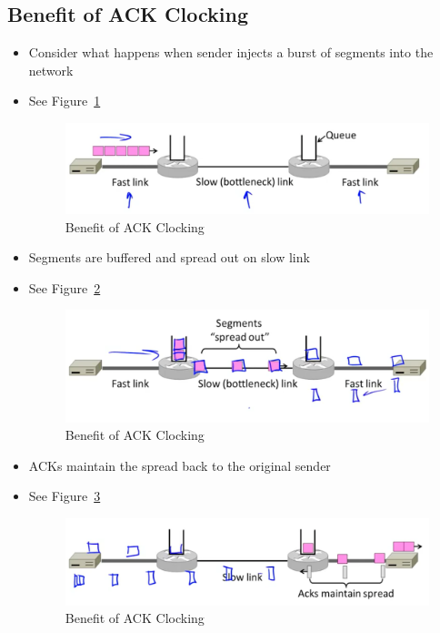 \documentclass[12pt]{ctexart}   %
\begin{document}
	\subsection{Benefit of ACK Clocking}
	\begin{itemize}
		\item Consider what happens when sender injects a burst of segments into the network
		\item See Figure~\ref{fig:7-5-3}
		  
		 \begin{figure}[h!] %
		\centering
		 \includegraphics[scale=0.7]{images/7-5-3}
		\caption{ Benefit of ACK Clocking}
		 \label{fig:7-5-3}
		 \end{figure}
		 
		 \item Segments are buffered and spread out on slow link
		 \item See Figure~\ref{fig:7-5-4}
		  
		 \begin{figure}[h!] %
		\centering
		 \includegraphics[scale=0.7]{images/7-5-4}
		\caption{ Benefit of ACK Clocking}
		 \label{fig:7-5-4}
		 \end{figure}
		 
		 \item ACKs maintain the spread back to the original sender
		 \item See Figure~\ref{fig:7-5-5}
		  
		 \begin{figure}[h!] %
		\centering
		 \includegraphics[scale=0.7]{images/7-5-5}
		\caption{ Benefit of ACK Clocking}
		 \label{fig:7-5-5}
		 \end{figure}
		 

\end{itemize}
\end{document}
